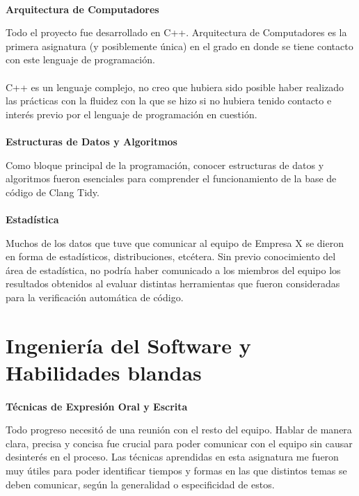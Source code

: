 \documentclass[12pt]{extreport} %
\begin{document}
\paragraph{}
\textbf{Arquitectura de Computadores}

Todo el proyecto fue desarrollado en C++. Arquitectura de Computadores
es la primera asignatura (y posiblemente única) en el grado en donde
se tiene contacto con este lenguaje de programación.

\paragraph{}
C++ es un lenguaje complejo, no creo que hubiera sido posible haber
realizado las prácticas con la fluidez con la que se hizo si no
hubiera tenido contacto e interés previo por el lenguaje de
programación en cuestión.

\paragraph{}
\textbf{Estructuras de Datos y Algoritmos}

Como bloque principal de la programación, conocer estructuras de datos
y algoritmos fueron esenciales para comprender el funcionamiento de la
base de código de Clang Tidy.

\paragraph{}
\textbf{Estadística}

Muchos de los datos que tuve que comunicar al equipo de Empresa X se
dieron en forma de estadísticos, distribuciones, etcétera. Sin previo
conocimiento del área de estadística, no podría haber comunicado a los
miembros del equipo los resultados obtenidos al evaluar distintas
herramientas que fueron consideradas para la verificación automática
de código.

\section{Ingeniería del Software y Habilidades blandas}

\paragraph{}
\textbf{Técnicas de Expresión Oral y Escrita}

Todo progreso necesitó de una reunión con el resto del equipo. Hablar
de manera clara, precisa y concisa fue crucial para poder comunicar
con el equipo sin causar desinterés en el proceso. Las técnicas
aprendidas en esta asignatura me fueron muy útiles para poder
identificar tiempos y formas en las que distintos temas se deben
comunicar, según la generalidad o especificidad de estos.
\end{document}
